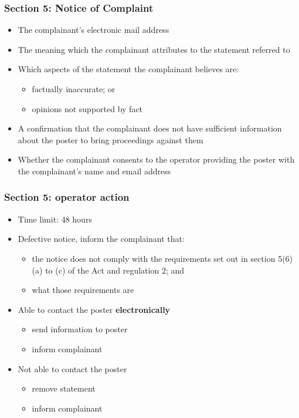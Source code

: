 \documentclass[ignorenonframetext,]{beamer}
\begin{document}
\begin{frame}
  \frametitle{Section 5: Notice of Complaint}

  \begin{itemize}
  \item The complainant's electronic mail address
  \item The meaning which the complainant attributes to the statement referred to
  \item Which aspects of the statement the complainant believes are:
    \begin{itemize}
    \item factually inaccurate; or
    \item opinions not supported by fact
    \end{itemize}
  \item A confirmation that the complainant does not have sufficient information about the poster to bring proceedings against them
  \item Whether the complainant consents to the operator providing the poster with the complainant's name and email address
\end{itemize}

\end{frame}

\begin{frame}
  \frametitle{Section 5: operator action}

  \begin{itemize}
  \item Time limit: 48 hours
  \item Defective notice, inform the complainant that:
\begin{itemize}
\item the notice does not comply with the requirements set out in section 5(6)(a) to (c) of the Act and regulation 2; and
\item what those requirements are
\end{itemize}
\item Able to contact the poster {\bf electronically}
  \begin{itemize}
  \item send information to poster
  \item inform complainant
  \end{itemize}
\item Not able to contact the poster
  \begin{itemize}
  \item remove statement
  \item inform complainant
  \end{itemize}

  \end{itemize}
\end{frame}
\end{document}
